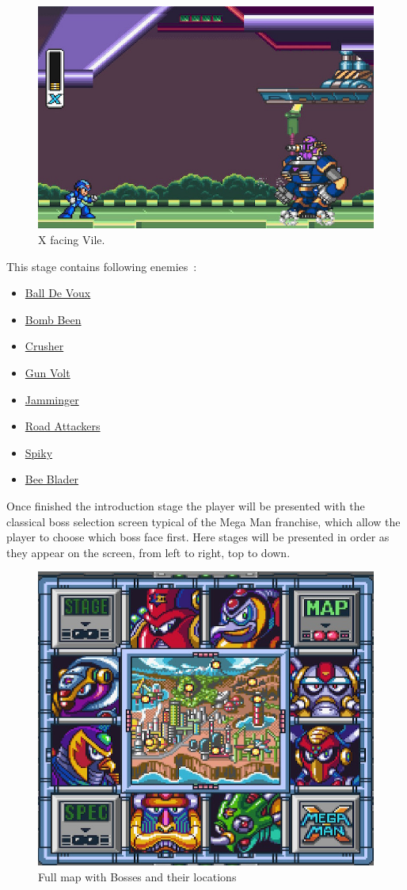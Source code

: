 \begin{figure}[htp]
	\centering
	\includegraphics[width=0.5\linewidth]{figures/X1/Highway_screenshot.jpg}
	\caption{X facing Vile.}
\end{figure}
This stage contains following enemies~\cite{wiki:Highway}:
\begin{itemize}
	\item \hyperlink{enem:Ball_De_Voux}{Ball De Voux}
	\item \hyperlink{enem:Bomb_Been}{Bomb Been}
	\item \hyperlink{enem:Crusher}{Crusher}
	\item \hyperlink{enem:Gun_Volt}{Gun Volt}
	\item \hyperlink{enem:Jamminger}{Jamminger}
	\item \hyperlink{enem:Road_Attackers}{Road Attackers}
	\item \hyperlink{enem:Spiky}{Spiky }
	\item \hyperlink{miniboss:Bee_Blader}{Bee Blader }
\end{itemize}


Once finished the introduction stage the player will be presented with the classical boss selection screen typical of the Mega Man franchise, which allow the player to choose which boss face first. Here stages will be presented in order as they appear on the screen, from left to right, top to down.
\begin{figure}[htp]
	\centering
	\includegraphics[width=0.5\linewidth]{figures/X1/Full_map.png}
	\caption{Full map with Bosses and their locations}
\end{figure}
 
